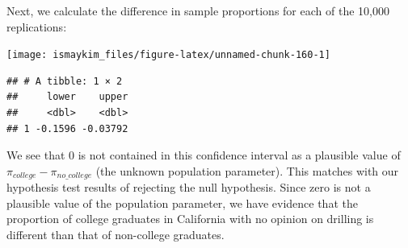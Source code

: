 \documentclass[]{tufte-book}
\newenvironment{Shaded}{\begin{snugshade}}{\end{snugshade}}
\newcommand{\KeywordTok}[1]{\textcolor[rgb]{0.13,0.29,0.53}{\textbf{{#1}}}}
\newcommand{\DataTypeTok}[1]{\textcolor[rgb]{0.13,0.29,0.53}{{#1}}}
\newcommand{\DecValTok}[1]{\textcolor[rgb]{0.00,0.00,0.81}{{#1}}}
\newcommand{\FloatTok}[1]{\textcolor[rgb]{0.00,0.00,0.81}{{#1}}}
\newcommand{\StringTok}[1]{\textcolor[rgb]{0.31,0.60,0.02}{{#1}}}
\newcommand{\NormalTok}[1]{{#1}}
\theoremstyle{definition}
\theoremstyle{definition}
\theoremstyle{remark}
\begin{document}
Next, we calculate the difference in sample proportions for each of the
10,000 replications:

\begin{Shaded}
\end{Shaded}

\begin{Shaded}
\end{Shaded}

\begin{center}\texttt{[image: ismaykim\_files/figure-latex/unnamed-chunk-160-1]} \end{center}

\begin{Shaded}
\end{Shaded}

\begin{verbatim}
## # A tibble: 1 × 2
##     lower    upper
##     <dbl>    <dbl>
## 1 -0.1596 -0.03792
\end{verbatim}

We see that 0 is not contained in this confidence interval as a
plausible value of \(\pi_{college} - \pi_{no\_college}\) (the unknown
population parameter). This matches with our hypothesis test results of
rejecting the null hypothesis. Since zero is not a plausible value of
the population parameter, we have evidence that the proportion of
college graduates in California with no opinion on drilling is different
than that of non-college graduates.
\end{document}
